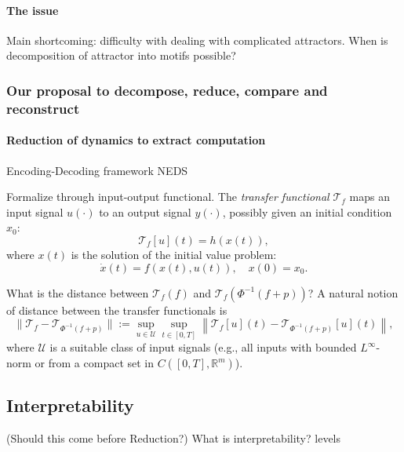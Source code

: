 \documentclass{article}
\newcommand{\ascomment}[1]{\textcolor{ascolor}{(#1)}}
\theoremstyle{definition} \newtheorem{definition}{Definition}  \newtheorem{example}{Example}
\theoremstyle{remark} \newtheorem{remark}{Remark}
\newcommand{\reals}{\mathbb{R}}
\newcounter{ct}
\begin{document}
\paragraph{The issue}
Main shortcoming: difficulty with dealing with complicated attractors.
When is decomposition of attractor into motifs possible?


\subsubsection{Our proposal to decompose, reduce, compare and reconstruct}
\paragraph{Reduction of dynamics to extract computation}
Encoding-Decoding framework
\citep{zhang2025neural} NEDS

Formalize through input-output functional.
The \emph{transfer functional} \( \mathcal{T}_f \) maps an input signal \( u(\cdot) \) to an output signal \( y(\cdot) \), possibly given an initial condition \( x_0 \):
\[
\mathcal{T}_f[u](t) = h(x(t)),
\]
where \( x(t) \) is the solution of the initial value problem:
\[
\dot{x}(t) = f(x(t), u(t)), \quad x(0) = x_0.
\]

What is the distance between $\mathcal{T}_f(f)$ and $\mathcal{T}_f(\Phi^{-1}(f+p))$?
A natural notion of distance between the transfer functionals is
\[
\|\mathcal{T}_f - \mathcal{T}_{\Phi^{-1}(f+p)}\| 
:= \sup_{u \in \mathcal{U}} \sup_{t \in [0, T]} 
\left\| \mathcal{T}_f[u](t) - \mathcal{T}_{\Phi^{-1}(f+p)}[u](t) \right\|,
\]
where \( \mathcal{U} \) is a suitable class of input signals (e.g., all inputs with bounded \( L^\infty \)-norm or from a compact set in \( C([0,T], \mathbb{R}^m) \)).





\subsection{Interpretability}
\ascomment{Should this come before Reduction?}
What is interpretability? \citep{erasmus2021interpretability}
\citep{madsen2024interpretability}
levels \citep{hochstein2022levels}
\end{document}
